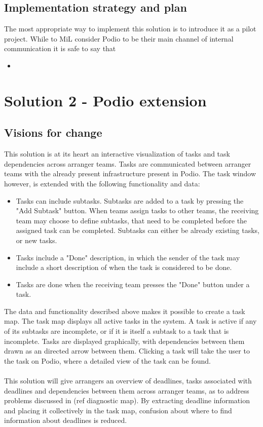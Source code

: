 \subsection{Implementation strategy and plan} 
The most appropriate way to implement this solution is to introduce it as a pilot project. While to MiL consider Podio to be their main channel of internal communication it is safe to say that 

\begin{itemize}
    \item 
\end{itemize}

\section{Solution 2 - Podio extension}
\subsection{Visions for change}
\label{visions_for_change}
This solution is at its heart an interactive visualization of tasks and task dependencies across arranger teams. Tasks are communicated between arranger teams with the already present infrastructure present in Podio. The task window however, is extended with the following functionality and data:
\begin{itemize}
    \item Tasks can include subtasks. Subtasks are added to a task by pressing the "Add Subtask" button. When teams assign tasks to other teams, the receiving team may choose to define subtasks, that need to be completed before the assigned task can be completed. Subtasks can either be already existing tasks, or new tasks.
    \item Tasks include a "Done" description, in which the sender of the task may include a short description of when the task is considered to be done.
    \item Tasks are done when the receiving team presses the "Done" button under a task.
\end{itemize}
The data and functionality described above makes it possible to create a task map. The task map displays all active tasks in the system. A task is active if any of its subtasks are incomplete, or if it is itself a subtask to a task that is incomplete. Tasks are displayed graphically, with dependencies between them drawn as an directed arrow between them. Clicking a task will take the user to the task on Podio, where a detailed view of the task can be found. 
\\ \\
This solution will give arrangers an overview of deadlines, tasks associated with deadlines and dependencies between them across arranger teams, as to address problems discussed in (ref diagnostic map). By extracting deadline information and placing it collectively in the task map, confusion about where to find information about deadlines is reduced.



